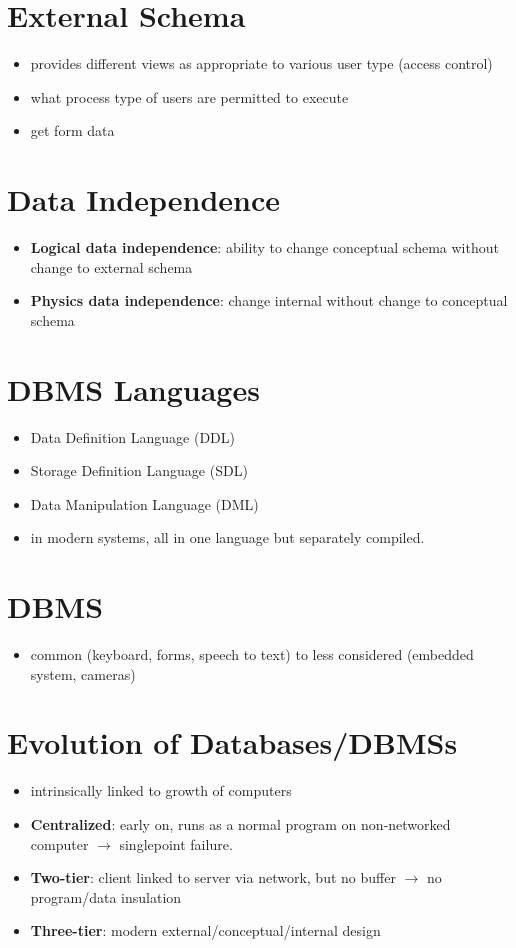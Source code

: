 \documentclass[12pt]{report}
\begin{document}
	\section{External Schema}
	\begin{itemize}
		\item provides different views as appropriate to various user type (access control)
		\item what process type of users are permitted to execute
		\item get form data
	\end{itemize}
	\section{Data Independence}
	\begin{itemize}
		\item \textbf{Logical data independence}: ability to change conceptual schema without change to external schema
		\item \textbf{Physics data independence}: change internal without change to conceptual schema
	\end{itemize}
	\section{DBMS Languages}
	\begin{itemize}
		\item Data Definition Language (DDL)
		\item Storage Definition Language (SDL)
		\item Data Manipulation Language (DML)
		\item in modern systems, all in one language but separately compiled.
	\end{itemize}
	\section{DBMS}
	\begin{itemize}
		\item common (keyboard, forms, speech to text) to less considered (embedded system, cameras)
	\end{itemize}
	\section{Evolution of Databases/DBMSs}
	\begin{itemize}
		\item intrinsically linked to growth of computers
		\item \textbf{Centralized}: early on, runs as a normal program on non-networked computer $\rightarrow$ singlepoint failure.
		\item \textbf{Two-tier}: client linked to server via network, but no buffer $\rightarrow$ no program/data insulation
		\item \textbf{Three-tier}: modern external/conceptual/internal design
	\end{itemize}
\end{document}

